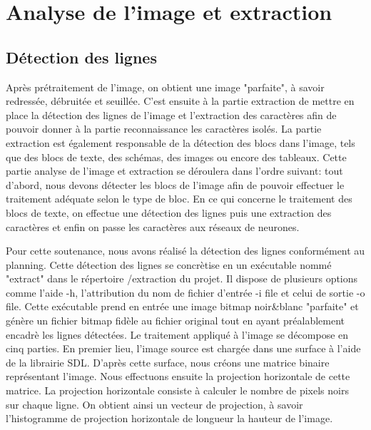 \documentclass[]{report}
\begin{document}



	\chapter{Analyse de l'image et extraction} %
	\label{cha:analyse_de_l'image_et_extraction}

    \section{D\'etection des lignes} %
    \label{sec:d'etection_des_lignes}
      Après prétraitement de l'image, on obtient une image "parfaite", à savoir redressée, débruitée et seuillée. C'est ensuite à la partie extraction de mettre en place la détection des lignes de l'image et l'extraction des caractères afin de pouvoir donner à la partie reconnaissance les caractères isolés. La partie extraction est également responsable de la détection des blocs dans l'image, tels que des blocs de texte, des schémas, des images ou encore des tableaux.
      Cette partie analyse de l'image et extraction se déroulera dans l'ordre suivant: tout d'abord, nous devons détecter les blocs de l'image afin de pouvoir effectuer le traitement adéquate selon le type de bloc. En ce qui concerne le traitement des blocs de texte, on effectue une détection des lignes puis une extraction des caractères et enfin on passe les caractères aux réseaux de neurones.

      Pour cette soutenance, nous avons réalisé la détection des lignes conformément au planning. Cette détection des lignes se concrètise en un exécutable nommé "extract" dans le répertoire /extraction du projet. Il dispose de plusieurs options comme l'aide -h, l'attribution du nom de fichier d'entrée -i file et celui de sortie -o file. Cette exécutable prend en entrée une image bitmap noir&blanc "parfaite" et génère un fichier bitmap fidèle au fichier original tout en ayant préalablement encadrè les lignes détectées.
      Le traitement appliqué à l'image se décompose en cinq parties. En premier lieu, l'image source est chargée dans une surface à l'aide de la librairie SDL. D'après cette surface, nous créons une matrice binaire représentant l'image. Nous effectuons ensuite la projection horizontale de cette matrice.
      La projection horizontale consiste à calculer le nombre de pixels noirs sur chaque ligne. On obtient ainsi un vecteur de projection, à savoir l'histogramme de projection horizontale de longueur la hauteur de l'image.
\end{document}
